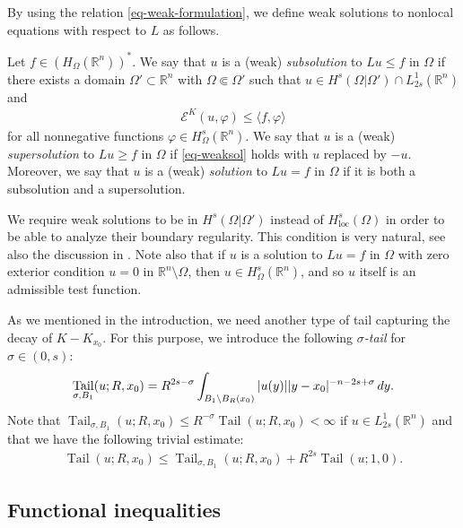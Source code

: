 \documentclass[11pt,reqno]{amsart}
\theoremstyle{plain}
\theoremstyle{definition}
\numberwithin{equation}{section}
\newcommand{\R}{\mathbb{R}}
\newcommand{\1}{\mathbbm{1}}
\DeclareMathOperator{\tail}{Tail}
\renewcommand{\d}{\textnormal{\,d}}
\begin{document}
By using the relation \eqref{eq-weak-formulation}, we define weak solutions to nonlocal equations with respect to $L$ as follows.

\begin{definition}
Let $f \in (H_\Omega(\R^n))^\ast$. We say that $u$ is a (weak) \emph{subsolution} to $Lu\leq f$ in $\Omega$ if there exists a domain $\Omega' \subset \R^n$ with $\Omega \Subset \Omega'$ such that $u \in H^s(\Omega | \Omega') \cap L^1_{2s}(\R^n)$ and
\begin{align}\label{eq-weaksol}
    \mathcal{E}^K(u, \varphi) \leq \langle f, \varphi \rangle
\end{align}
for all nonnegative functions $\varphi \in H^s_\Omega(\R^n)$. We say that $u$ is a (weak) \emph{supersolution} to $Lu\geq f$ in $\Omega$ if \eqref{eq-weaksol} holds with $u$ replaced by $-u$. Moreover, we say that $u$ is a (weak) \emph{solution} to $Lu=f$ in $\Omega$ if it is both a subsolution and a supersolution.
\end{definition}

We require weak solutions to be in $H^s(\Omega | \Omega')$ instead of $H^s_{\mathrm{loc}}(\Omega)$ in order to be able to analyze their boundary regularity. This condition is very natural, see also the discussion in \cite[p.5-6]{KiLe23}. Note also that if $u$ is a solution to $Lu=f$ in $\Omega$ with zero exterior condition $u=0$ in $\R^n \setminus \Omega$, then $u \in H^s_\Omega(\R^n)$, and so $u$ itself is an admissible test function.

As we mentioned in the introduction, we need another type of tail capturing the decay of $K-K_{x_0}$. For this purpose, we introduce the following \emph{$\sigma$-tail} for $\sigma \in (0, s)$:
\begin{align*}
    \tail_{\sigma,B_1}(u;R,x_0) = R^{2s-\sigma} \int_{B_1 \setminus B_R(x_0)} |u(y)| |y-x_0|^{-n-2s+\sigma} \d y.
\end{align*}
Note that $\tail_{\sigma,B_1}(u;R,x_0) \leq R^{-\sigma}\tail(u;R,x_0)<\infty$ if $u \in L^1_{2s}(\R^n)$ and that we have the following trivial estimate:
\begin{align}
\label{eq:sigma-tail-est}
    \tail(u;R,x_0) \le \tail_{\sigma,B_1}(u;R,x_0) + R^{2s} \tail(u;1,0).
\end{align}




\subsection{Functional inequalities}
\end{document}
